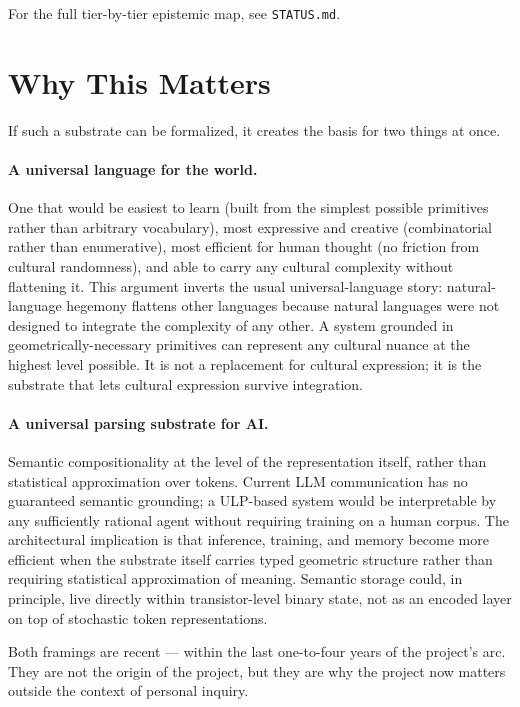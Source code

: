 \documentclass[11pt, letterpaper]{article}
\begin{document}
For the full tier-by-tier epistemic map, see \texttt{STATUS.md}.

\section{Why This Matters}

If such a substrate can be formalized, it creates the basis for two things at once.

\paragraph{A universal language for the world.} One that would be easiest to learn (built from the simplest possible primitives rather than arbitrary vocabulary), most expressive and creative (combinatorial rather than enumerative), most efficient for human thought (no friction from cultural randomness), and able to carry any cultural complexity without flattening it. This argument inverts the usual universal-language story: natural-language hegemony flattens other languages because natural languages were not designed to integrate the complexity of any other. A system grounded in geometrically-necessary primitives can represent any cultural nuance at the highest level possible. It is not a replacement for cultural expression; it is the substrate that lets cultural expression survive integration.

\paragraph{A universal parsing substrate for AI.} Semantic compositionality at the level of the representation itself, rather than statistical approximation over tokens. Current LLM communication has no guaranteed semantic grounding; a ULP-based system would be interpretable by any sufficiently rational agent without requiring training on a human corpus. The architectural implication is that inference, training, and memory become more efficient when the substrate itself carries typed geometric structure rather than requiring statistical approximation of meaning. Semantic storage could, in principle, live directly within transistor-level binary state, not as an encoded layer on top of stochastic token representations.

Both framings are recent --- within the last one-to-four years of the project's arc. They are not the origin of the project, but they are why the project now matters outside the context of personal inquiry.
\end{document}

